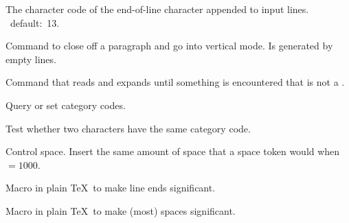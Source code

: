 \documentclass{book}
\begin{document}
\label{cschap:endlinechar}\label{cschap:ignorespaces}\label{cschap:catcode}\label{cschap:char32}\label{cschap:obeylines}\label{cschap:obeyspaces}
\begin{inventory}
\item [\cs{endlinechar}]  
      The character code of the end-of-line character 
      appended to input lines.
      \IniTeX\ default:~13.
\item [\cs{par}]  
      Command to close off a paragraph and go into vertical mode.
      Is generated by empty lines.

\item [\cs{ignorespaces}]   
      Command that reads and expands until something is
      encountered that is not a .

\item [\cs{catcode}] 
      Query or set category codes.

\item [\cs{ifcat}]  
      Test whether two characters have the same category code.

\item [\cs{\char32}]
      Control space.
      Insert the same amount of space that a space token would
      when ${}=1000$.

\item [\cs{obeylines}]
      Macro in plain \TeX\ to make line ends significant.

\item [\cs{obeyspaces}]
      Macro in plain \TeX\ to make (most) spaces significant.
\end{inventory}
\end{document}
